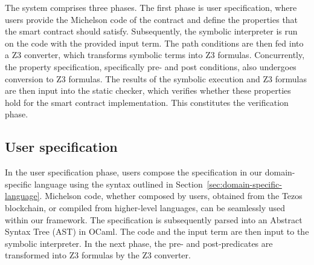 \documentclass[a4paper,USenglish,cleveref, autoref,anonymous]{lipics-v2021}
\begin{document}
The system comprises three phases. The first phase is user specification, where users
provide the Michelson code of the contract and define the properties
that the smart contract should satisfy. Subsequently, the symbolic
interpreter is run on the code with the provided input term.  The
path conditions are then fed into a Z3 converter, which transforms
symbolic terms into Z3 formulas. Concurrently, the property
specification, specifically pre- and post conditions, also undergoes
conversion to Z3 formulas. The results of the symbolic execution and
Z3 formulas are then input into the static checker, which verifies
whether these properties hold for the smart contract
implementation. This constitutes the verification phase. 

\subsection{User specification}
\label{sec:user-specification}

In the user specification phase, users compose the specification in
our domain-specific language using the syntax outlined in
Section~\ref{sec:domain-specific-language}. Michelson code, whether
composed by users, obtained from the Tezos blockchain, or compiled
from higher-level languages, can be seamlessly used within our
framework. The specification is subsequently parsed into an Abstract
Syntax Tree (AST) in OCaml. The code and the input term are then
input to the symbolic interpreter. In the next phase, the pre- and
post-predicates are transformed into Z3 formulas by the Z3 converter.
\end{document}
